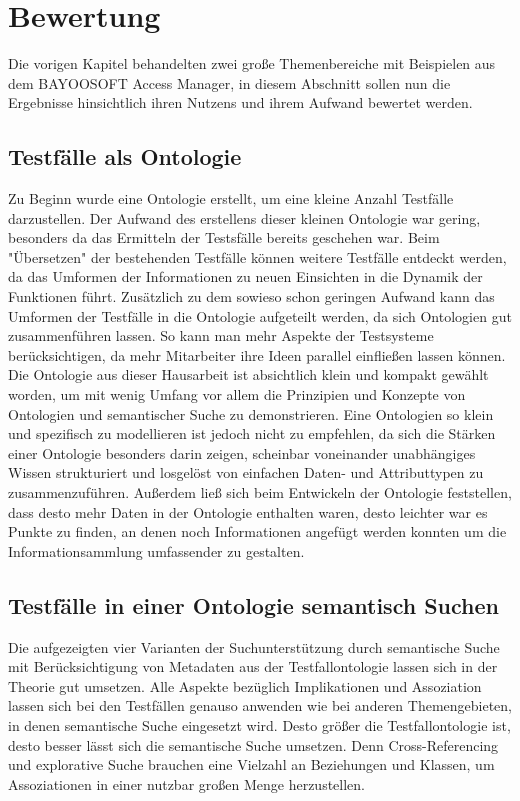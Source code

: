 \chapter{Bewertung}
Die vorigen Kapitel behandelten zwei große Themenbereiche mit Beispielen aus dem BAYOOSOFT Access Manager, in diesem Abschnitt sollen nun die Ergebnisse hinsichtlich ihren Nutzens und ihrem Aufwand bewertet werden. 
\section{Testfälle als Ontologie}
Zu Beginn wurde eine Ontologie erstellt, um eine kleine Anzahl Testfälle darzustellen. Der Aufwand des erstellens dieser kleinen Ontologie war gering, besonders da das Ermitteln der Testsfälle bereits geschehen war. Beim "Übersetzen" der bestehenden Testfälle können weitere Testfälle entdeckt werden, da das Umformen der Informationen zu neuen Einsichten in die Dynamik der Funktionen führt. Zusätzlich zu dem sowieso schon geringen Aufwand kann das Umformen der Testfälle in die Ontologie aufgeteilt werden, da sich Ontologien gut zusammenführen lassen. So kann man mehr Aspekte der Testsysteme berücksichtigen, da mehr Mitarbeiter ihre Ideen parallel einfließen lassen können. Die Ontologie aus dieser Hausarbeit ist absichtlich klein und kompakt gewählt worden, um mit wenig Umfang vor allem die Prinzipien und Konzepte von Ontologien und semantischer Suche zu demonstrieren. Eine Ontologien so klein und spezifisch zu modellieren ist jedoch nicht zu empfehlen, da sich die Stärken einer Ontologie besonders darin zeigen, scheinbar voneinander unabhängiges Wissen strukturiert und losgelöst von einfachen Daten- und Attributtypen zu zusammenzuführen. Außerdem ließ sich beim Entwickeln der Ontologie feststellen, dass desto mehr Daten in der Ontologie enthalten waren, desto leichter war es Punkte zu finden, an denen noch Informationen angefügt werden konnten um die Informationsammlung umfassender zu gestalten. \section{Testfälle in einer Ontologie semantisch Suchen}
Die aufgezeigten vier Varianten der Suchunterstützung durch semantische Suche mit Berücksichtigung von Metadaten aus der Testfallontologie lassen sich in der Theorie gut umsetzen. Alle Aspekte bezüglich Implikationen und Assoziation lassen sich bei den Testfällen genauso anwenden wie bei anderen Themengebieten, in denen semantische Suche eingesetzt wird. Desto größer die Testfallontologie ist, desto besser lässt sich die semantische Suche umsetzen. Denn Cross-Referencing und explorative Suche brauchen eine Vielzahl an Beziehungen und Klassen, um Assoziationen in einer nutzbar großen Menge herzustellen. 
